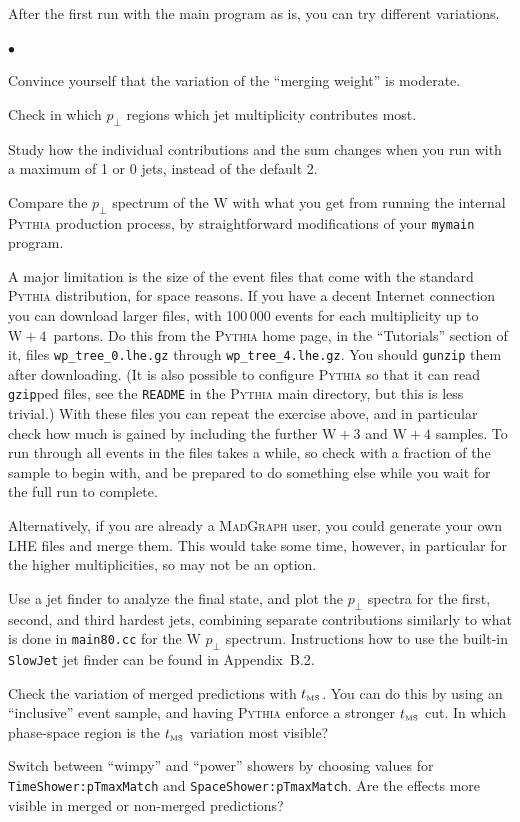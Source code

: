 \documentclass[12pt,a4paper]{article}
\newcommand{\pT}{p_{\perp}}
\newcommand{\W}{{\mathrm W}}
\newcommand{\tms}{\ensuremath{t_{\textnormal{\tiny MS}}}}
\newenvironment{Itemize}{\begin{list}{$\bullet$}%
{\setlength{\topsep}{0.4mm}\setlength{\partopsep}{0.4mm}%
\setlength{\itemsep}{0.4mm}\setlength{\parsep}{0.4mm}}}%
{\end{list}}
\begin{document}
After the first run with the main program as is, you can try different 
variations.
\begin{Itemize}
\item Convince yourself that the variation of the ``merging weight'' 
is moderate.
 \item Check in which $p_\perp$ regions which jet multiplicity
contributes most.
\item Study how the individual contributions and the sum changes when
you run with a maximum of 1 or 0 jets, instead of the default 2.
\item Compare the $p_\perp$ spectrum of the $\W$ with what you get 
from running the internal \textsc{Pythia} production process, by 
straightforward modifications of your \texttt{mymain} program.
\item A major limitation is the size of the event files that come with 
the standard \textsc{Pythia} distribution, for space reasons. If you 
have a decent Internet connection you can download larger files, 
with 100\,000 events for each multiplicity up to $\W + 4$~partons. 
Do this from the \textsc{Pythia} home page, in the ``Tutorials'' section of 
it, files \texttt{wp\_tree\_0.lhe.gz} through \texttt{wp\_tree\_4.lhe.gz}.
You should \texttt{gunzip} them after downloading. (It is also possible 
to configure \textsc{Pythia} so that it can read \texttt{gzip}ped files,
see the \texttt{README} in the \textsc{Pythia} main directory, but this 
is less trivial.) With these files you can repeat the exercise above, 
and in particular check how much is gained by including the further 
$\W + 3$ and $\W + 4$ samples. To run through all events in the files
takes a while, so check with a fraction of the sample to begin with,
and be prepared to do something else while you wait for the full run to 
complete.  
\item Alternatively, if you are already a \textsc{MadGraph} user,
you could generate your own LHE files and merge them. This would
take some time, however, in particular for the higher multiplicities,
so may not be an option.
\item Use a jet finder to analyze the final state, and plot the 
$\pT$ spectra for the first, second, and third hardest jets,
combining separate contributions similarly to what is done in
\texttt{main80.cc} for the $\W$ $\pT$ spectrum. Instructions how 
to use the built-in \texttt{SlowJet} jet finder can be found in 
Appendix~B.2.
\item Check the variation of merged predictions with $\tms$. You can 
do this by using an ``inclusive'' event sample, and having 
\textsc{Pythia} enforce a stronger $\tms$ cut. In which phase-space 
region is the $\tms$ variation most visible?
\item Switch between ``wimpy'' and ``power'' showers by choosing 
values for \texttt{TimeShower:pTmaxMatch} and 
\texttt{SpaceShower:pTmaxMatch}. Are the effects more visible in 
merged or non-merged predictions?
\end{Itemize}
\end{document}
